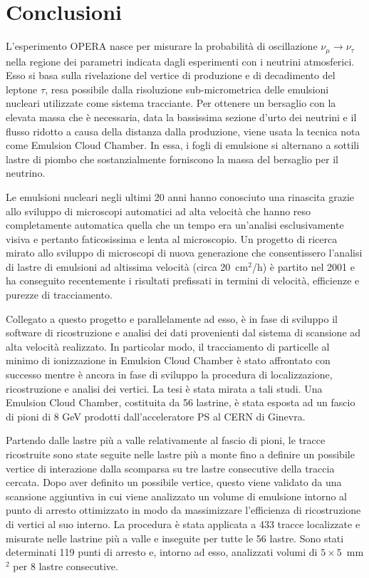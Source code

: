 \chapter*{Conclusioni}

L'esperimento OPERA nasce per misurare la probabilit\`a di oscillazione
$\nu_{\mu} \rightarrow \nu_{\tau}$ nella regione dei parametri indicata
dagli esperimenti con i neutrini atmosferici. Esso si basa sulla
rivelazione del vertice di produzione e di decadimento del leptone $\tau$,
resa possibile dalla risoluzione sub-micrometrica delle emulsioni nucleari
utilizzate come sistema tracciante. Per ottenere un bersaglio con la elevata massa
che \`e necessaria, data la bassissima sezione d'urto dei neutrini e il flusso ridotto a
 causa della distanza dalla produzione, viene usata la tecnica nota come Emulsion
Cloud Chamber. In essa, i fogli di emulsione si alternano a sottili  lastre di piombo che
sostanzialmente forniscono la massa del bersaglio per il neutrino.

Le emulsioni nucleari negli ultimi 20 anni hanno conosciuto una
rinascita grazie allo sviluppo di microscopi automatici ad alta
velocit\`a che hanno reso completamente automatica quella che un tempo
era un'analisi esclusivamente visiva e pertanto faticosissima e lenta
al microscopio. Un progetto di ricerca mirato allo sviluppo di
microscopi di nuova generazione che consentissero l'analisi di
lastre di emulsioni ad altissima velocit\`a (circa 20~cm$^2$/h) \`e
partito nel 2001 e ha conseguito recentemente i risultati prefissati
in termini di velocit\`a, efficienze e purezze di tracciamento. 

Collegato a questo progetto e parallelamente ad esso, \`e in fase di
sviluppo il software di ricostruzione e analisi dei dati provenienti dal
sistema di scansione ad alta velocit\`a realizzato. In particolar modo, il
tracciamento di particelle al minimo di ionizzazione in Emulsion Cloud
Chamber \`e stato affrontato con successo mentre \`e ancora in fase di
sviluppo la procedura di localizzazione, ricostruzione e analisi dei
vertici. La tesi \`e stata mirata a tali studi. Una Emulsion Cloud
Chamber, costituita da 56 lastrine, \`e stata esposta ad un fascio di
pioni di 8 GeV prodotti dall'acceleratore PS al CERN di Ginevra.

Partendo dalle lastre pi\`u a valle relativamente al fascio di pioni, le
tracce ricostruite sono state seguite nelle lastre pi\`u a monte fino a
definire un possibile vertice di interazione dalla scomparsa su tre lastre
consecutive della traccia cercata.  Dopo aver definito un possibile
vertice, questo viene validato da una scansione aggiuntiva in cui viene
analizzato un volume di emulsione intorno al punto di arresto ottimizzato
in modo da massimizzare l'efficienza di ricostruzione di vertici al suo
interno. La procedura \`e stata applicata a 433 tracce localizzate e  misurate
nelle lastrine pi\`u a valle e inseguite per tutte le 56 lastre. Sono
stati determinati 119 punti di arresto e, intorno ad esso,
analizzati volumi di $5 \times 5$~mm$^2$ per 8 lastre consecutive.

